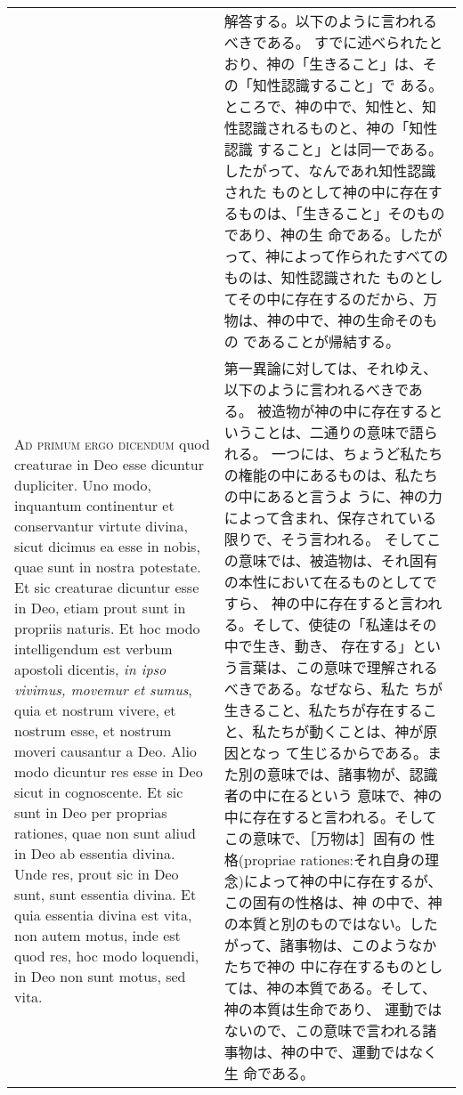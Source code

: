 \documentclass[10pt]{jsarticle} %
\begin{document}
\begin{longtable}{p{21em}p{21em}}
&


解答する。以下のように言われるべきである。
すでに述べられたとおり、神の「生きること」は、その「知性認識すること」で
 ある。ところで、神の中で、知性と、知性認識されるものと、神の「知性認識
 すること」とは同一である。したがって、なんであれ知性認識された
 ものとして神の中に存在するものは、「生きること」そのものであり、神の生
 命である。したがって、神によって作られたすべてのものは、知性認識された
 ものとしてその中に存在するのだから、万物は、神の中で、神の生命そのもの
 であることが帰結する。

\\




{\scshape Ad primum ergo dicendum} quod creaturae in Deo
 esse dicuntur dupliciter. Uno modo, inquantum continentur et
 conservantur virtute divina, sicut dicimus ea esse in nobis, quae sunt
 in nostra potestate. Et sic creaturae dicuntur esse in Deo, etiam prout
 sunt in propriis naturis. Et hoc modo intelligendum est verbum apostoli
 dicentis, {\itshape in ipso vivimus, movemur et sumus}, quia et nostrum vivere, et
 nostrum esse, et nostrum moveri causantur a Deo. Alio modo dicuntur res
 esse in Deo sicut in cognoscente. Et sic sunt in Deo per proprias
 rationes, quae non sunt aliud in Deo ab essentia divina. Unde res,
 prout sic in Deo sunt, sunt essentia divina. Et quia essentia divina
 est vita, non autem motus, inde est quod res, hoc modo loquendi, in Deo
 non sunt motus, sed vita.


&

第一異論に対しては、それゆえ、以下のように言われるべきである。
被造物が神の中に存在するということは、二通りの意味で語られる。
一つには、ちょうど私たちの権能の中にあるものは、私たちの中にあると言うよ
 うに、神の力によって含まれ、保存されている限りで、そう言われる。
そしてこの意味では、被造物は、それ固有の本性において在るものとしてですら、
 神の中に存在すると言われる。そして、使徒の「私達はその中で生き、動き、
 存在する」という言葉は、この意味で理解されるべきである。なぜなら、私た
 ちが生きること、私たちが存在すること、私たちが動くことは、神が原因となっ
 て生じるからである。また別の意味では、諸事物が、認識者の中に在るという
 意味で、神の中に存在すると言われる。そしてこの意味で、［万物は］固有の
 性格(propriae rationes:それ自身の理念)によって神の中に存在するが、この固有の性格は、神
 の中で、神の本質と別のものではない。したがって、諸事物は、このようなかたちで神の
 中に存在するものとしては、神の本質である。そして、神の本質は生命であり、
 運動ではないので、この意味で言われる諸事物は、神の中で、運動ではなく生
 命である。



\end{longtable}
\end{document}

